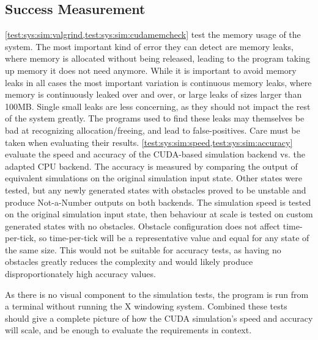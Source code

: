 \subsection{Success Measurement}\label{sec:Testing:SuccessMeasurement}
\cref{test:sys:sim:valgrind,test:sys:sim:cudamemcheck} test the memory usage of the system.
The most important kind of error they can detect are memory leaks, where memory is allocated without being released, leading to the program taking up memory it does not need anymore.
While it is important to avoid memory leaks in all cases the most important variation is continuous memory leaks, where memory is continuously leaked over and over, or large leaks of sizes larger than 100MB.
Single small leaks are less concerning, as they should not impact the rest of the system greatly.
The programs used to find these leaks may themselves be bad at recognizing allocation/freeing\cite{ValgrindProblemsBlog}, and lead to false-positives.
Care must be taken when evaluating their results.
\cref{test:sys:sim:speed,test:sys:sim:accuracy} evaluate the speed and accuracy of the CUDA-based simulation backend vs. the adapted CPU backend.
The accuracy is measured by comparing the output of equivalent simulations on the original simulation input state.
Other states were tested, but any newly generated states with obstacles proved to be unstable and produce Not-a-Number outputs on both backends.
The simulation speed is tested on the original simulation input state, then behaviour at scale is tested on custom generated states with no obstacles.
Obstacle configuration does not affect time-per-tick, so time-per-tick will be a representative value and equal for any state of the same size.
This would not be suitable for accuracy tests, as having no obstacles greatly reduces the complexity and would likely produce disproportionately high accuracy values.

As there is no visual component to the simulation tests, the program is run from a terminal without running the X windowing system.
Combined these tests should give a complete picture of how the CUDA simulation's speed and accuracy will scale, and be enough to evaluate the requirements in context.

